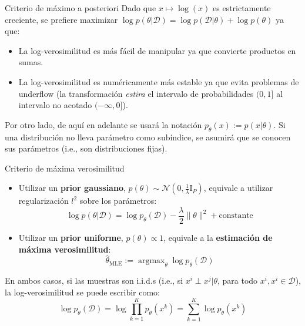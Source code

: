 \documentclass{beamer}
\newcommand{\argmax}{\operatorname{argmax}}
\begin{document}
\begin{frame}{Criterio de máximo a posteriori}
    Dado que $x\mapsto \log(x)$ es estrictamente creciente, se prefiere maximizar $\log p(\theta|\mathcal{D})=\log p(\mathcal{D}|\theta)+\log p(\theta)$ ya que:
    \begin{itemize}
        \item La log-verosimilitud es más fácil de manipular ya que convierte productos en sumas.
        \item La log-verosimilitud es numéricamente más estable ya que evita problemas de underflow (la transformación \textit{estira} el intervalo de probabilidades $(0,1]$ al intervalo no acotado $(-\infty,0]$).
    \end{itemize}
    Por otro lado, de aquí en adelante se usará la notación $p_\theta(x):=p(x|\theta)$. Si una distribución no lleva parámetro como subíndice, se asumirá que se conocen sus parámetros (i.e., son distribuciones fijas).
\end{frame}

\begin{frame}{Criterio de máxima verosimilitud}
    \begin{itemize}
        \item Utilizar un \textbf{prior gaussiano}, $p(\theta)\sim\mathcal{N}(0,\frac{1}{\lambda}\text{I}_P)$, equivale a utilizar regularización $l^2$ sobre los parámetros:
              \begin{equation*}
                  \log p(\theta|\mathcal{D})=\log p_\theta(\mathcal{D}) - \frac{\lambda}{2}\|\theta\|^2 + \text{constante}
              \end{equation*}
        \item Utilizar un \textbf{prior uniforme}, $p(\theta)\propto 1$, equivale a la \textbf{estimación de máxima verosimilitud}:
              \begin{equation*}
                  \hat\theta_\text{MLE}:=\argmax_\theta \log p_\theta(\mathcal{D})
              \end{equation*}
    \end{itemize}
    En ambos casos, si las muestras son i.i.d.s (i.e., si $x^i\perp x^j|\theta$, para todo $x^i, x^i\in\mathcal{D}$), la log-verosimilitud se puede escribir como:
    \begin{equation*}
        \log p_\theta(\mathcal{D})
        =\log \prod_{k=1}^K p_\theta(x^k)
        =\sum_{k=1}^K \log p_\theta(x^k)
    \end{equation*}
\end{frame}
\end{document}
